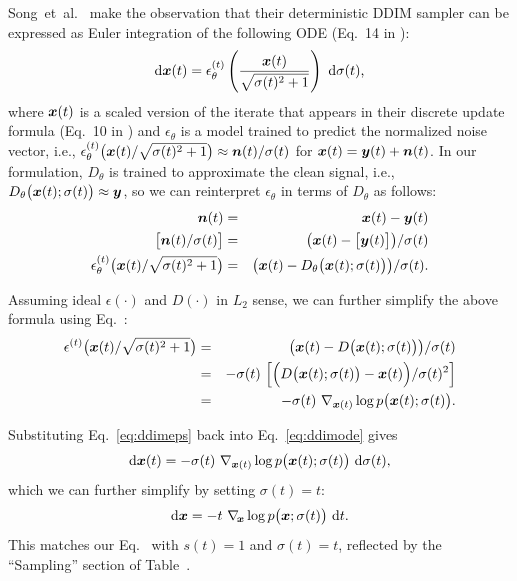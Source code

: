 Song~et~al.~\cite{Song2020ddim} make the observation that their deterministic DDIM sampler can be expressed as Euler integration of the following ODE (Eq.~14 in \cite{Song2020ddim}):
\begin{equation}
  \label{eq:ddimode}
  \mathrm{d}\boldsymbol{x}(t) = \epsilon_\theta^{(t)} \left( \frac{\boldsymbol{x}(t)}{\sqrt{\sigma(t)^2 + 1}} \right) ~\mathrm{d}\sigma(t)
  \text{,}
\end{equation}
where $\boldsymbol{x}(t)$ is a scaled version of the iterate that appears in their discrete update formula (Eq.~10 in \cite{Song2020ddim}) and $\epsilon_\theta$ is a model trained to predict the normalized noise vector, i.e., $\epsilon_\theta^{(t)}\big( \boldsymbol{x}(t) / \sqrt{\sigma(t)^2 + 1} \big) \approx \boldsymbol{n}(t) / \sigma(t)$ for $\boldsymbol{x}(t) = \boldsymbol{y}(t) + \boldsymbol{n}(t)$.
In our formulation, $D_\theta$ is trained to approximate the clean signal, i.e., $D_\theta\big( \boldsymbol{x}(t); \sigma(t) \big) \approx \boldsymbol{y}$, so we can reinterpret $\epsilon_\theta$ in terms of $D_\theta$ as follows:
\begin{eqnarray}
  \boldsymbol{n}(t) &=& \boldsymbol{x}(t) - \boldsymbol{y}(t) \\
  \big[ \boldsymbol{n}(t) / \sigma(t) \big] &=& \big( \boldsymbol{x}(t) - \big[ \boldsymbol{y}(t) \big] \big) / \sigma(t) \\
  \epsilon_\theta^{(t)} \big( \boldsymbol{x}(t) / \sqrt{\sigma(t)^2 + 1} \big) &=& \big( \boldsymbol{x}(t) - D_\theta \big( \boldsymbol{x}(t); \sigma(t) \big) \big) / \sigma(t)
  \text{.}
\end{eqnarray}

Assuming ideal $\epsilon(\cdot)$ and $D(\cdot)$ in $L_2$ sense, we can further simplify the above formula using Eq.~:
\begin{eqnarray}
  \epsilon^{(t)} \big( \boldsymbol{x}(t) / \sqrt{\sigma(t)^2 + 1} \big) &=& \big( \boldsymbol{x}(t) - D \big( \boldsymbol{x}(t); \sigma(t) \big) \big) / \sigma(t) \label{eq:ddimdenoiser} \\
  &=& -\sigma(t) ~\Big[ \Big( D \big( \boldsymbol{x}(t); \sigma(t) \big) - \boldsymbol{x}(t) \Big) / \sigma(t)^2 \Big] \\
  &=& -\sigma(t) ~\nabla_{\boldsymbol{x}(t)} \log p\big( \boldsymbol{x}(t); \sigma(t) \big)
  \label{eq:ddimeps}
  \text{.}
\end{eqnarray}

Substituting Eq.~\ref{eq:ddimeps} back into Eq.~\ref{eq:ddimode} gives
\begin{equation}
  \mathrm{d}\boldsymbol{x}(t) = -\sigma(t) ~\nabla_{\boldsymbol{x}(t)} \log p\big( \boldsymbol{x}(t); \sigma(t) \big) ~\mathrm{d}\sigma(t)
  \text{,}
\end{equation}
which we can further simplify by setting $\sigma(t) = t$:
\begin{equation}
  \mathrm{d}\boldsymbol{x} = -t ~\nabla_{\hspace{-0.5mm}\boldsymbol{x}} \log p\big( \boldsymbol{x}; \sigma(t) \big) ~\mathrm{d} t
  \text{.}
\end{equation}
This matches our Eq.~ with $s(t) = 1$ and $\sigma(t) = t$, reflected by the ``Sampling'' section of Table~.

